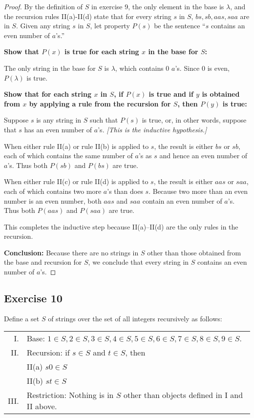 \documentclass[14pt]{extarticle}
\begin{document}
\begin{proof}
    By the definition of $S$ in exercise 9, the only element in the base is $\lambda$, and the recursion rules II(a)-II(d)
    state that for every string $s$ in $S$, $bs, sb, aas, saa$ are in $S$. Given any string $s$ in $S$,
    let property $P(s)$ be the sentence “$s$ contains an even number of $a$'s.”

    {\bf Show that $P(x)$ is true for each string $x$ in the base for $S$:}

    The only string in the base for $S$ is $\lambda$, which contains 0 $a$'s. Since 0 is even, $P(\lambda)$ is true.

        {\bf Show that for each string $x$ in $S$, if $P(x)$ is true and if $y$ is obtained from $x$ by applying a rule
            from the recursion for $S$, then $P(y)$ is true:}

    Suppose $s$ is any string in $S$ such that $P(s)$ is true, or, in other words, suppose that $s$ has an even number of $a$'s. {\it [This is the inductive hypothesis.]}

    When either rule II(a) or rule II(b) is applied to $s$, the result is either $bs$ or $sb$, each of which contains the
    same number of $a$'s as $s$ and hence an even number of $a$'s. Thus both $P(sb)$ and $P(bs)$ are true.

    When either rule II(c) or rule II(d) is applied to $s$, the result is either $aas$ or $saa$, each of which contains two
    more $a$'s than does $s$. Because two more than an even number is an even number, both $aas$ and $saa$ contain an
    even number of $a$’s. Thus both $P(aas)$ and $P(saa)$ are true.

    This completes the inductive step because II(a)–II(d) are the only rules in the recursion.

        {\bf Conclusion:} Because there are no strings in $S$ other than those obtained from the base and recursion for $S$, we
    conclude that every string in $S$ contains an even number of $a$'s.
\end{proof}

\subsection{Exercise 10}
Define a set $S$ of strings over the set of all integers recursively as follows:

\begin{tabular}{rl}
    I.   & Base: $1 \in S, 2 \in S, 3 \in S, 4 \in S, 5 \in S, 6 \in S, 7 \in S, 8 \in S, 9 \in S$. \\
    II.  & Recursion: if $s \in S$ and $t \in S$, then                                              \\
         & II(a) $s0 \in S$                                                                         \\
         & II(b) $st \in S$                                                                         \\
    III. & Restriction: Nothing is in $S$ other than objects defined in I and II above.
\end{tabular}
\end{document}
